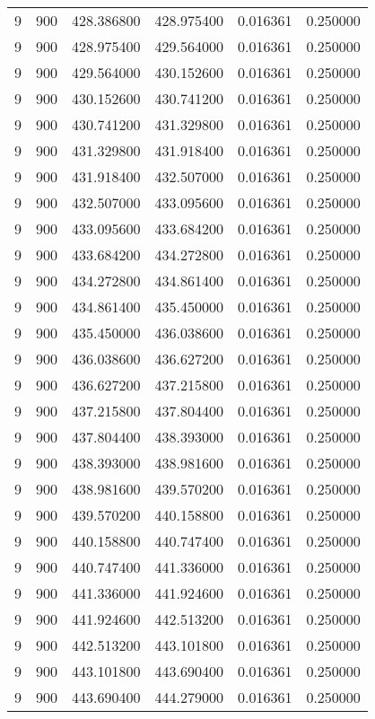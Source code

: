 \begin{longtable}{rrrrrr}
9 & 900 & 428.386800 & 428.975400 & 0.016361 & 0.250000 \\
9 & 900 & 428.975400 & 429.564000 & 0.016361 & 0.250000 \\
9 & 900 & 429.564000 & 430.152600 & 0.016361 & 0.250000 \\
9 & 900 & 430.152600 & 430.741200 & 0.016361 & 0.250000 \\
9 & 900 & 430.741200 & 431.329800 & 0.016361 & 0.250000 \\
9 & 900 & 431.329800 & 431.918400 & 0.016361 & 0.250000 \\
9 & 900 & 431.918400 & 432.507000 & 0.016361 & 0.250000 \\
9 & 900 & 432.507000 & 433.095600 & 0.016361 & 0.250000 \\
9 & 900 & 433.095600 & 433.684200 & 0.016361 & 0.250000 \\
9 & 900 & 433.684200 & 434.272800 & 0.016361 & 0.250000 \\
9 & 900 & 434.272800 & 434.861400 & 0.016361 & 0.250000 \\
9 & 900 & 434.861400 & 435.450000 & 0.016361 & 0.250000 \\
9 & 900 & 435.450000 & 436.038600 & 0.016361 & 0.250000 \\
9 & 900 & 436.038600 & 436.627200 & 0.016361 & 0.250000 \\
9 & 900 & 436.627200 & 437.215800 & 0.016361 & 0.250000 \\
9 & 900 & 437.215800 & 437.804400 & 0.016361 & 0.250000 \\
9 & 900 & 437.804400 & 438.393000 & 0.016361 & 0.250000 \\
9 & 900 & 438.393000 & 438.981600 & 0.016361 & 0.250000 \\
9 & 900 & 438.981600 & 439.570200 & 0.016361 & 0.250000 \\
9 & 900 & 439.570200 & 440.158800 & 0.016361 & 0.250000 \\
9 & 900 & 440.158800 & 440.747400 & 0.016361 & 0.250000 \\
9 & 900 & 440.747400 & 441.336000 & 0.016361 & 0.250000 \\
9 & 900 & 441.336000 & 441.924600 & 0.016361 & 0.250000 \\
9 & 900 & 441.924600 & 442.513200 & 0.016361 & 0.250000 \\
9 & 900 & 442.513200 & 443.101800 & 0.016361 & 0.250000 \\
9 & 900 & 443.101800 & 443.690400 & 0.016361 & 0.250000 \\
9 & 900 & 443.690400 & 444.279000 & 0.016361 & 0.250000 \\

\end{longtable}
